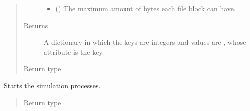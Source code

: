 \documentclass[letterpaper,10pt,english]{sphinxmanual}
\begin{document}
\begin{fulllineitems}
\begin{fulllineitems}
\begin{quote}
\begin{description}
\begin{itemize}
\item {} 
 () \textendash{} The maximum amount of bytes each file block can have.

\end{itemize}

\item[{Returns}] \leavevmode
A dictionary in which the keys are integers and values are
{\hyperref[\detokenize{app.domain.helpers:app.domain.helpers.smart_dataclasses.FileBlockData}]{}}, whose
attribute {\hyperref[\detokenize{app.domain.helpers:app.domain.helpers.smart_dataclasses.FileBlockData.number}]{}}
is the key.

\item[{Return type}] \leavevmode
{\hyperref[\detokenize{app:app.type_hints.ReplicasDict}]{}}

\end{description}\end{quote}

\end{fulllineitems}


\begin{fulllineitems}
\label{\detokenize{app.domain:app.domain.master_servers.Master.execute_simulation}}
Starts the simulation processes.
\begin{quote}\begin{description}
\item[{Return type}] \leavevmode
{}

\end{description}\end{quote}

\end{fulllineitems}



\end{fulllineitems}
\end{document}
